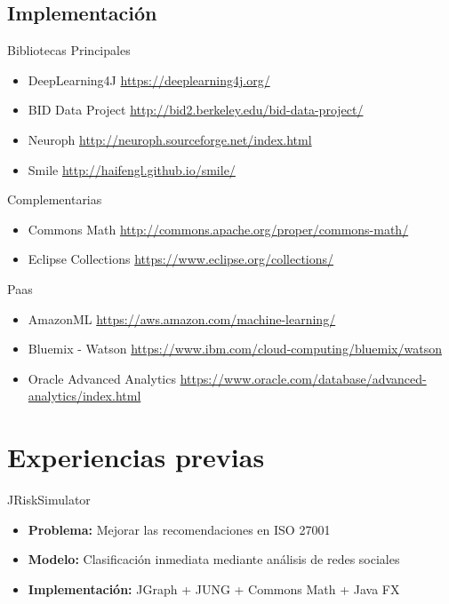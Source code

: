 \documentclass{beamer}
\begin{document}
\subsection{Implementación}
\begin{frame}{Bibliotecas}
    Principales
    \begin{itemize}
        \item DeepLearning4J \url{https://deeplearning4j.org/}
        \item BID Data Project \url{http://bid2.berkeley.edu/bid-data-project/}
        \item Neuroph \url{http://neuroph.sourceforge.net/index.html}
                \item Smile \url{http://haifengl.github.io/smile/}
    \end{itemize}

    Complementarias
    \begin{itemize}
        \item Commons Math \url{http://commons.apache.org/proper/commons-math/}
        \item Eclipse Collections \url{https://www.eclipse.org/collections/}
    \end{itemize}
\end{frame}

\begin{frame}{Paas}
    \begin{itemize}
        \item AmazonML \url{https://aws.amazon.com/machine-learning/}
        \item Bluemix - Watson \url{https://www.ibm.com/cloud-computing/bluemix/watson}
        \item Oracle Advanced Analytics \url{https://www.oracle.com/database/advanced-analytics/index.html}
    \end{itemize}
\end{frame}



\section{Experiencias previas}

\begin{frame}{JRiskSimulator}
    \begin{itemize}
        \item \textbf{Problema:} Mejorar las recomendaciones en ISO 27001
        \item \textbf{Modelo: } Clasificación inmediata mediante análisis de redes sociales
        \item \textbf{Implementación: }  JGraph + JUNG + Commons Math + Java FX
    \end{itemize}
\end{frame}
\end{document}
